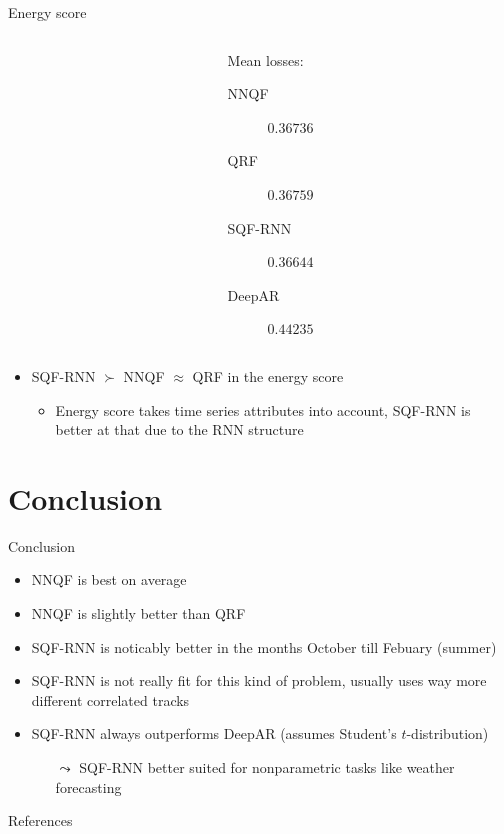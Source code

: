 \documentclass[10pt,aspectratio=169]{beamer}
\begin{document}
\begin{frame}[fragile]{Energy score}
    \begin{columns}
    \begin{column}{0.5\textwidth}
    \begin{flushright}
        
    \end{flushright}
    \end{column}
    \begin{column}{0.5\textwidth}
    Mean losses:
    \begin{description}
        \item[\textcolor{TolDarkBlue}{NNQF}] \(0.36736\)
        \item[\textcolor{TolLightBrown}{QRF}] \(0.36759\)
        \item[\textcolor{TolLightGreen}{SQF-RNN}] \(0.36644\)
        \item[\textcolor{TolDarkBrown}{DeepAR}] \(0.44235\)
    \end{description}
    \end{column}
    \end{columns}
    
    \begin{itemize}
        \item SQF-RNN \(\succ\) NNQF \(\approx\) QRF in the energy score
        \begin{itemize}
            \item Energy score takes time series attributes into account, SQF-RNN is better at that due to the RNN structure
        \end{itemize}
    \end{itemize}
\end{frame}

\section{Conclusion}

\begin{frame}{Conclusion}
    \begin{itemize}
        \item NNQF is best on average
        \item NNQF is slightly better than QRF
        \item SQF-RNN is noticably better in the months October till Febuary (summer)
        \item SQF-RNN is not really fit for this kind of problem, usually uses way more different correlated tracks
        \item SQF-RNN always outperforms DeepAR (assumes Student's \(t\)-distribution)
        \begin{itemize}
            \item[\(\leadsto\)] SQF-RNN better suited for nonparametric tasks like weather forecasting
        \end{itemize}
    \end{itemize}
\end{frame}

\begin{frame}{References}
    \printbibliography[heading=none]
\end{frame}
\end{document}
